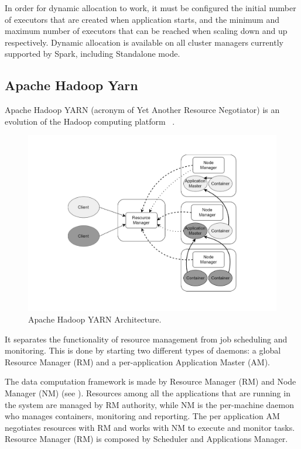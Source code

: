 In order for dynamic allocation to work, it must be configured the initial number of executors that are created when application starts, and the minimum and maximum number of executors that can be reached when scaling down and up respectively. Dynamic allocation is available on all cluster managers currently supported by Spark, including Standalone mode.

\subsection{Apache Hadoop Yarn}\label{sec:hadoop_yarn}
Apache Hadoop YARN (acronym of Yet Another Resource Negotiator) is an evolution of the Hadoop computing  platform ~\cite{Vavilapalli:2013:AHY:2523616.2523633}. 
\begin{figure}
	\vspace{-1.5cm}
	\centering
	\includegraphics[width=\columnwidth]{Images/apache_hadoop_yarn_architecture.pdf}  
	\vspace{-1.5cm}
	\caption[Apache Hadoop YARN Architecture]{Apache Hadoop YARN Architecture.}
	\label{fig:apacheHadoopYarnArchitecture}
\end{figure}
It separates the functionality of resource management from job scheduling and monitoring. This is done by starting two different types of daemons: a global Resource Manager (RM) and a per-application Application Master (AM). 

The data computation framework is made by Resource Manager (RM) and Node Manager (NM) (see ). Resources among all the applications that are running in the system are managed by RM authority, while NM is the per-machine daemon who manages containers, monitoring and reporting. The per application AM negotiates resources with RM and works with NM  to execute and monitor tasks. Resource Manager (RM) is composed by Scheduler and Applications Manager. 

